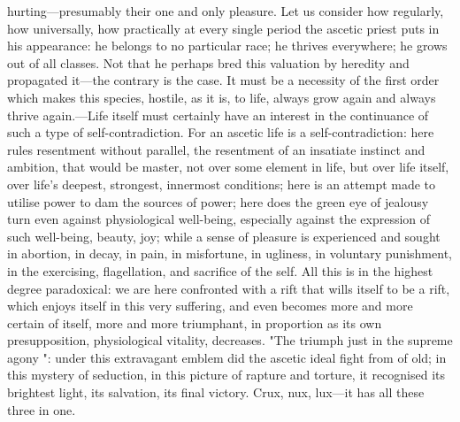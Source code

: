 \documentclass[12pt]{article}
\begin{document}
hurting---presumably their one and only pleasure. Let us consider how regularly, how universally, how practically at every single period the ascetic priest puts in his appearance: he belongs to no particular race; he thrives everywhere; he grows out of all classes. Not that he perhaps bred this valuation by heredity and propagated it---the contrary is the case. It must be a necessity of the first order which makes this species, hostile, as it is, to life, always grow again and always thrive again.---Life itself must certainly have an interest in the continuance of such a type of self-contradiction. For an ascetic life is a self-contradiction: here rules resentment without parallel, the resentment of an insatiate instinct and ambition, that would be master, not over some element in life, but over life itself, over life's deepest, strongest, innermost conditions; here is an attempt made to utilise power to dam the sources of power; here does the green eye of jealousy turn even against physiological well-being, especially against the expression of such well-being, beauty, joy; while a sense of pleasure is experienced and sought in abortion, in decay, in pain, in misfortune, in ugliness, in voluntary punishment, in the exercising, flagellation, and sacrifice of the self. All this is in the highest degree paradoxical: we are here confronted with a rift that wills itself to be a rift, which enjoys itself in this very suffering, and even becomes more and more certain of itself, more and more triumphant, in proportion as its own presupposition, physiological vitality, decreases. "The triumph just in the supreme agony ": under this extravagant emblem did the ascetic ideal fight from of old; in this mystery of seduction, in this picture of rapture and torture, it recognised its brightest light, its salvation, its final victory. Crux, nux, lux---it has all these three in one.
\end{document}
